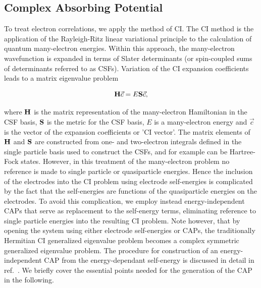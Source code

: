 
\subsection{Complex Absorbing Potential}
\label{subsec:CAP}

To treat electron correlations, we apply the method of \ac{CI}. The \ac{CI}
method is the application of the Rayleigh-Ritz linear variational principle
to the calculation of quantum many-electron energies. Within this approach,
the many-electron wavefunction is expanded in terms of Slater determinants
(or spin-coupled sums of determinants referred to as \acp{CSF}). Variation
of the \ac{CI} expansion coefficients leads to a matrix eigenvalue problem

\begin{equation}
\mathbf{H} \vec{c} = E \mathbf{S} \vec{c},
\end{equation} 

where $\mathbf{H}$ is the matrix representation of the many-electron
Hamiltonian in the CSF basis, $\mathbf{S}$ is the metric for the CSF basis,
$E$ is a many-electron energy and $\vec{c}$ is the vector of the
expansion coefficients or 'CI vector'. The matrix elements of $\mathbf{H}$
and $\mathbf{S}$ are constructed from one- and two-electron integrals
defined in the single particle basis used to construct the CSFs, and for
example can be Hartree-Fock states. However, in this treatment of the
many-electron problem no reference is made to single particle or
quasiparticle energies. Hence the inclusion of the electrodes into the
CI problem using electrode self-energies is complicated by the fact that
the self-energies are functions of the quasiparticle energies on the
electrodes. To avoid this complication, we employ instead energy-independent
\acp{CAP} that serve as replacement to the self-energy terms, eliminating
reference to single particle energies into the resulting \ac{CI} problem.
Note however, that by opening the system using either electrode self-energies
or \acp{CAP},  the traditionally Hermitian \ac{CI} generalized eigenvalue
problem becomes a complex symmetric generalized eigenvalue problem. The
procedure for construction of an energy-independent \ai \ac{CAP} from the
energy-dependant self-energy is discussed in detail in ref.~\cite{henderson}.
We briefly cover the essential points needed for the generation of the
\ac{CAP} in the following.

